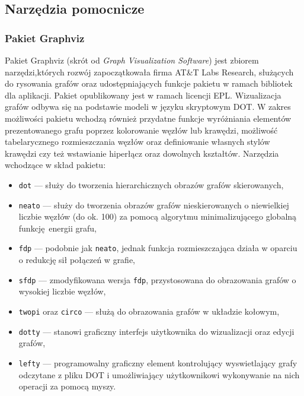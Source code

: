 \subsection{Narzędzia pomocnicze}
\label{ss_technologies_misc}
\subsubsection{Pakiet Graphviz}
\label{sss_technologies_misc_graphviz}
\par{
  Pakiet Graphviz (skrót od \emph{Graph Visualization Software}) jest zbiorem narzędzi,których rozwój zapoczątkowała firma AT\&T Labs Research, służących do rysowania grafów oraz udostępniających funkcje pakietu w ramach bibliotek dla aplikacji.
  Pakiet opublikowany jest w ramach licencji EPL.
  Wizualizacja grafów odbywa się na podstawie modeli w języku skryptowym DOT.
  W zakres możliwości pakietu wchodzą również przydatne funkcje wyróżniania elementów prezentowanego grafu poprzez kolorowanie węzłów lub krawędzi, możliwość tabelarycznego rozmieszczania węzłów oraz definiowanie własnych stylów krawędzi czy też wstawianie hiperłącz oraz dowolnych kształtów.
  Narzędzia wchodzące w skład pakietu:
  \begin{itemize}
    \item \texttt{dot} --- służy do tworzenia hierarchicznych obrazów grafów skierowanych,
    \item \texttt{neato} --- służy do tworzenia obrazów grafów nieskierowanych o niewielkiej liczbie węzłów (do ok. 100) za pomocą algorytmu minimalizującego globalną funkcję energii grafu,
    \item \texttt{fdp} --- podobnie jak \texttt{neato}, jednak funkcja rozmieszczająca działa w oparciu o redukcję sił połączeń w grafie,
    \item \texttt{sfdp} --- zmodyfikowana wersja \texttt{fdp}, przystosowana do obrazowania grafów o wysokiej liczbie węzłów,
    \item \texttt{twopi} oraz \texttt{circo} --- służą do obrazowania grafów w układzie kołowym,
    \item \texttt{dotty} --- stanowi graficzny interfejs użytkownika do wizualizacji oraz edycji grafów,
    \item \texttt{lefty} --- programowalny graficzny element kontrolujący wyswietlający grafy odczytane z pliku DOT i umożliwiający użytkownikowi wykonywanie na nich operacji za pomocą myszy.
  \end{itemize}
}
